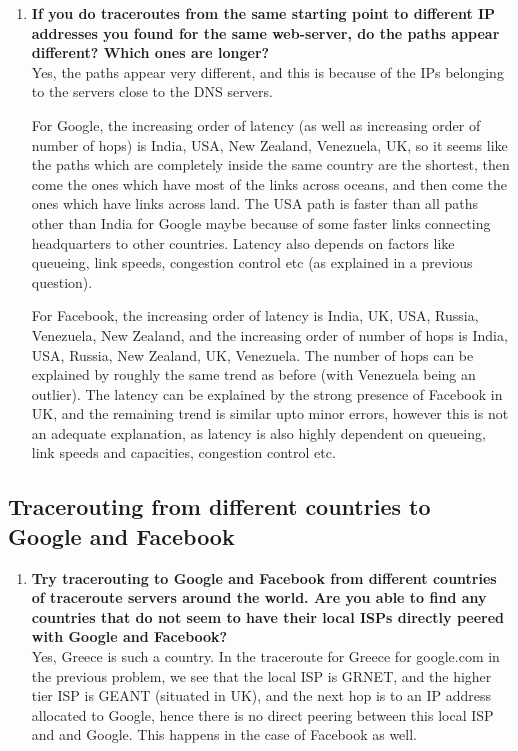 \documentclass[a4paper]{article}
\newcommand{\nl}{\vspace{0.2cm}\\}
\begin{document}
\begin{enumerate}
    \item \textbf{If you do traceroutes from the same starting point to different IP addresses you found for the same web-server, do the paths appear different? Which ones are longer?}\nl
        Yes, the paths appear very different, and this is because of the IPs belonging to the servers close to the DNS servers.

        For Google, the increasing order of latency (as well as increasing order of number of hops) is India, USA, New Zealand, Venezuela, UK, so it seems like the paths which are completely inside the same country are the shortest, then come the ones which have most of the links across oceans, and then come the ones which have links across land. The USA path is faster than all paths other than India for Google maybe because of some faster links connecting headquarters to other
        countries. Latency also depends on factors like queueing, link speeds, congestion control etc (as explained in a previous question).

        For Facebook, the increasing order of latency is India, UK, USA, Russia, Venezuela, New Zealand, and the increasing order of number of hops is India, USA, Russia, New Zealand, UK, Venezuela. The number of hops can be explained by roughly the same trend as before (with Venezuela being an outlier). The latency can be explained by the strong presence of Facebook in UK, and the remaining trend is similar upto minor errors, however this is not an adequate explanation, as
        latency is also highly dependent on queueing, link speeds and capacities, congestion control etc.

\end{enumerate}

\subsection{Tracerouting from different countries to Google and Facebook}

\begin{enumerate}
    \item \textbf{Try tracerouting to Google and Facebook from different countries of traceroute servers around the world. Are you able to find any countries that do not seem to have their local ISPs directly peered with Google and Facebook?}\nl

        Yes, Greece is such a country. In the traceroute for Greece for google.com in the previous problem, we see that the local ISP is GRNET, and the higher tier ISP is GEANT (situated in UK), and the next hop is to an IP address allocated to Google, hence there is no direct peering between this local ISP and and Google. This happens in the case of Facebook as well.


\end{enumerate}
\end{document}
